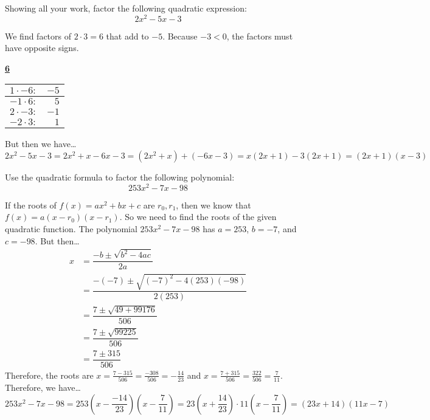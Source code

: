 \documentclass[11pt,letterpaper]{article}
\begin{document}

 Showing all your work, factor the following quadratic expression:
	\[
	2x^2 - 5x - 3
	\] \pspace

\sol We find factors of $2 \cdot 3= 6$ that add to $-5$. Because $-3 < 0$, the factors must have opposite signs. 
	\begin{table}[!ht]
	\centering
	\underline{\bfseries 6} \pvspace{0.2cm}
	\begin{tabular}{rr} \hline
	\multicolumn{1}{|r}{$1 \cdot -6 \colon$} & \multicolumn{1}{r|}{$-5$} \\ \hline
	$-1 \cdot 6 \colon$ & $5$ \\
	$2 \cdot -3 \colon$ & $-1$ \\
	$-2 \cdot 3 \colon$ & $1$ 
	\end{tabular}
	\end{table}
But then we have\dots
	\[
	2x^2 - 5x - 3= 2x^2 + x - 6x - 3= (2x^2 + x) + (-6x - 3)= x(2x + 1) - 3(2x + 1)= (2x + 1)(x - 3)
	\]



\newpage



 Use the quadratic formula to factor the following polynomial:
	\[
	253x^2 - 7x - 98
	\] \pspace

\sol If the roots of $f(x)= ax^2 + bx + c$ are $r_0, r_1$, then we know that $f(x)= a(x - r_0)(x - r_1)$. So we need to find the roots of the given quadratic function. The polynomial $253x^2 - 7x - 98$ has $a= 253$, $b= -7$, and $c= -98$. But then\dots
	\[
	\begin{aligned}
	x&= \dfrac{-b \pm \sqrt{b^2 - 4ac}}{2a} \\[0.3cm]
	&= \dfrac{-(-7) \pm \sqrt{(-7)^2 - 4(253)(-98)}}{2(253)} \\[0.3cm]
	&= \dfrac{7 \pm \sqrt{49 + 99176}}{506} \\[0.3cm]
	&= \dfrac{7 \pm \sqrt{99225}}{506} \\[0.3cm]
	&= \dfrac{7 \pm 315}{506}
	\end{aligned}
	\] \pspace
Therefore, the roots are $x= \frac{7 - 315}{506}= \frac{-308}{506}= -\frac{14}{23}$ and $x= \frac{7 + 315}{506}= \frac{322}{506}= \frac{7}{11}$. Therefore, we have\dots
	\[
	253x^2 - 7x - 98= 253 \left(x - \dfrac{-14}{23} \right) \left(x - \dfrac{7}{11} \right)= 23 \left(x + \dfrac{14}{23} \right) \cdot 11 \left(x - \dfrac{7}{11} \right)= (23x + 14) (11x - 7)
	\]
\end{document}
